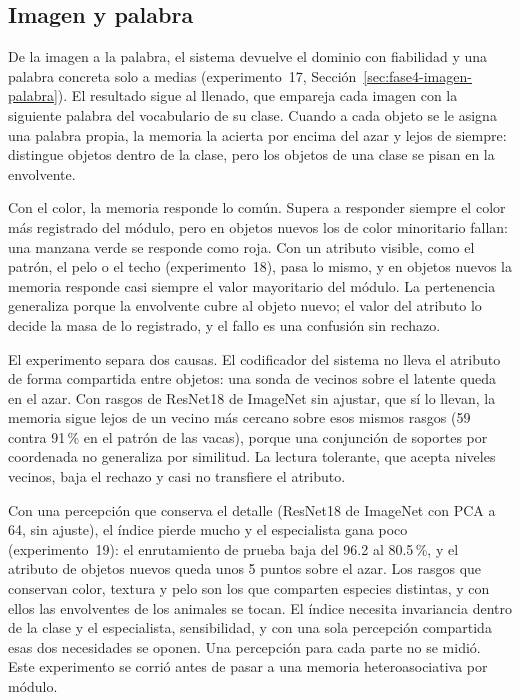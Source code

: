 \subsection{Imagen y palabra}
\label{fase:disc-imagen-palabra}

De la imagen a la palabra, el sistema devuelve el dominio con fiabilidad y una palabra
concreta solo a medias (experimento~17, Sección~\ref{sec:fase4-imagen-palabra}).
El resultado sigue al llenado, que empareja cada imagen con la siguiente palabra del
vocabulario de su clase.
Cuando a cada objeto se le asigna una palabra propia, la memoria la acierta por encima
del azar y lejos de siempre: distingue objetos dentro de la clase, pero los objetos de
una clase se pisan en la envolvente.

Con el color, la memoria responde lo común.
Supera a responder siempre el color más registrado del módulo, pero en objetos nuevos
los de color minoritario fallan: una manzana verde se responde como roja.
Con un atributo visible, como el patrón, el pelo o el techo (experimento~18), pasa lo
mismo, y en objetos nuevos la memoria responde casi siempre el valor mayoritario del
módulo.
La pertenencia generaliza porque la envolvente cubre al objeto nuevo; el valor del
atributo lo decide la masa de lo registrado, y el fallo es una confusión sin rechazo.

El experimento separa dos causas.
El codificador del sistema no lleva el atributo de forma compartida entre objetos: una
sonda de vecinos sobre el latente queda en el azar.
Con rasgos de ResNet18 de ImageNet sin ajustar, que sí lo llevan, la memoria sigue lejos
de un vecino más cercano sobre esos mismos rasgos (59 contra 91\,\% en el patrón de las
vacas), porque una conjunción de soportes por coordenada no generaliza por similitud.
La lectura tolerante, que acepta niveles vecinos, baja el rechazo y casi no transfiere
el atributo.

Con una percepción que conserva el detalle (ResNet18 de ImageNet con PCA a 64, sin
ajuste), el índice pierde mucho y el especialista gana poco (experimento~19): el
enrutamiento de prueba baja del 96.2 al 80.5\,\%, y el atributo de objetos nuevos queda
unos 5 puntos sobre el azar.
Los rasgos que conservan color, textura y pelo son los que comparten especies
distintas, y con ellos las envolventes de los animales se tocan.
El índice necesita invariancia dentro de la clase y el especialista, sensibilidad, y
con una sola percepción compartida esas dos necesidades se oponen.
Una percepción para cada parte no se midió.
Este experimento se corrió antes de pasar a una memoria heteroasociativa por módulo.

